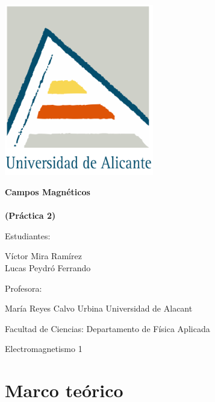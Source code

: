 \documentclass[11pt]{article}
\newcommand{\titulo}{Campos Magnéticos\\\ \\(Práctica 2)}
\newcommand{\nombreestudiante}{Víctor Mira Ramírez\\ Lucas Peydró Ferrando}
\newcommand{\nombredirector}{María Reyes Calvo Urbina}
\newcommand{\fecha}{\date{Junio 2023}}  %
\begin{document}
\begin{titlepage}
	\centering
	\includegraphics[width=65mm]{fotos/logoUA.png}\par
	\vspace{1cm}
	{\huge\bfseries \vspace{15mm} \titulo \par}
	\vfill
	{\large 
	\vfill
	Estudiantes:\par\vspace{2mm}
	\nombreestudiante\par
	\vfill
	Profesora:\par\vspace{2mm}
    \nombredirector
    \vfill
    Universidad de Alacant\par
    Facultad de Ciencias: Departamento de Física Aplicada\par
    Electromagnetismo 1\par
	\fecha\par}
\end{titlepage}

\pagebreak

\begin{abstract}\label{sec:abstract}
    \noindent Esta práctica tiene como objetivo el cálculo numérico y representación visual del campo magnético generado por una espira por la que circula una corriente eléctrica, un momento dipolar magnético y una distribución de momentos magnéticos.
\end{abstract}

\vspace{0.3cm}
\tableofcontents
\newpage

\vspace{-0.2cm}
\section{Marco teórico}
    \vspace{-0.15cm}
\end{document}
